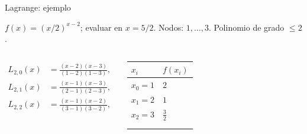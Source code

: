 \documentclass[original_version/main.tex]{subfiles}
\begin{document}
\begin{frame}[t]{Lagrange: ejemplo}
\par\noindent\begin{minipage}[t][7.5mm][t]{\textwidth}\small\strut $f(x)=(x/2)^{x-2}$; evaluar en $x=5/2$. Nodos: $1,\ldots,3$. Polinomio de grado $\le 2$.\end{minipage}\par\nointerlineskip
\begin{columns}[T]\small\setlength{\abovedisplayskip}{4pt}\setlength{\belowdisplayskip}{4pt}\scriptsize\begin{align*}L_{2,0}(x)&=\frac{(x-2)(x-3)}{(1-2)(1-3)},\\L_{2,1}(x)&=\frac{(x-1)(x-3)}{(2-1)(2-3)},\\L_{2,2}(x)&=\frac{(x-1)(x-2)}{(3-1)(3-2)},\\\end{align*}\begingroup\small\setlength{\tabcolsep}{3pt}\begin{center}\begin{tabular}{|C{.42\textwidth}|C{.42\textwidth}|}\hline
\rule[-2mm]{0pt}{6mm}$x_i$&$f(x_i)$\\\hline
\rule[-2.5mm]{0pt}{6mm}$x_0=1$&$2$\\\hline
\rule[-2.5mm]{0pt}{6mm}$x_1=2$&$1$\\\hline
\rule[-2.5mm]{0pt}{6mm}$x_2=3$&$\frac{3}{2}$\\\hline
\rule[-2.5mm]{0pt}{6mm}&\\\hline
\rule[-2.5mm]{0pt}{6mm}&\\\hline
\end{tabular}\end{center}\endgroup\par
\end{columns}
\end{frame}
\end{document}
